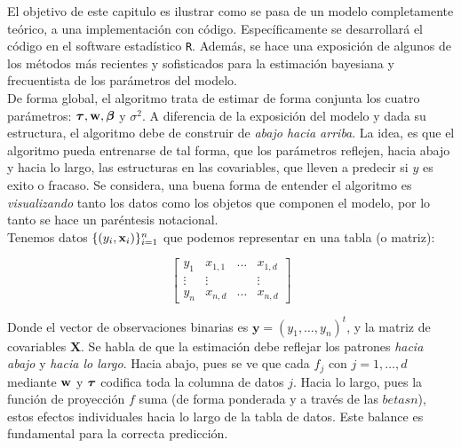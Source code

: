\documentclass[../Main/Main.tex]{subfiles}
\begin{document}
El objetivo de este capitulo es ilustrar como se pasa de un modelo completamente teórico, a una implementación con código. Específicamente se desarrollará el código en el software estadístico \verb|R|. Además, se hace una exposición de algunos de los métodos más recientes y sofisticados para la estimación bayesiana y frecuentista de los parámetros del modelo. \\

De forma global, el algoritmo trata de estimar de forma conjunta los cuatro parámetros: $\boldsymbol{\tau}, \mathbf{w}, \boldsymbol{\beta}$ y $\sigma^2$. A diferencia de la exposición del modelo y dada su estructura, el algoritmo debe de construir de \textit{abajo hacia arriba}. La idea, es que el algoritmo pueda entrenarse de tal forma, que los parámetros reflejen, hacia abajo y hacia lo largo, las estructuras en las covariables, que lleven a predecir si $y$ es exito o fracaso. Se considera, una buena forma de entender el algoritmo es \textit{visualizando} tanto los datos como los objetos que componen el modelo, por lo tanto se hace un paréntesis  notacional.\\

Tenemos datos $\{(y_i,\mathbf{x}_i)\}_{i = 1}^n$ que podemos representar en una tabla (o matriz):

$$\left[\begin{array}{c|ccc} 
y_1 & x_{1,1} & \ldots & x_{1,d} \\ 
\vdots & \vdots & ~ & \vdots \\ 
y_n & x_{n,d} & \ldots & x_{n,d}
\end{array}\right]$$

Donde el vector de observaciones binarias es $\mathbf{y} = (y_1,\ldots,y_n)^t$, y la matriz de covariables $\mathbf{X}$. Se habla de que la estimación debe reflejar los patrones \textit{hacia abajo} y \textit{hacia lo largo}. Hacia abajo, pues se ve que cada $f_j$ con $j = 1,\ldots,d$ mediante $\mathbf{w}$ y $\boldsymbol{\tau}$ codifica toda la columna de datos $j$. Hacia lo largo, pues la función de proyección $f$ suma (de forma ponderada y a través de las $betasn$), estos efectos individuales hacia lo largo de la tabla de datos. Este balance es fundamental para la correcta predicción.

\end{document}
